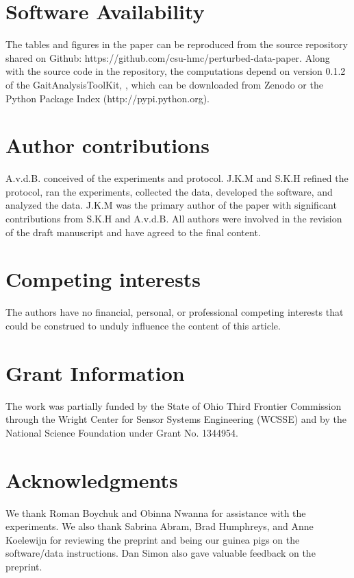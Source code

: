 \documentclass[fleqn,12pt]{wlpeerj}
\begin{document}
\section*{Software Availability}
The tables and figures in the paper can be reproduced from the source
repository shared on Github: https://github.com/csu-hmc/perturbed-data-paper.
Along with the source code in the repository, the computations depend on
version 0.1.2 of the GaitAnalysisToolKit, \cite{Moore2014a}, which can be
downloaded from Zenodo or the Python Package Index (http://pypi.python.org).

\section*{Author contributions}
A.v.d.B. conceived of the experiments and protocol. J.K.M and S.K.H refined the
protocol, ran the experiments, collected the data, developed the software, and
analyzed the data. J.K.M was the primary author of the paper with significant
contributions from S.K.H and A.v.d.B. All authors were involved in the revision
of the draft manuscript and have agreed to the final content.

\section*{Competing interests}
The authors have no financial, personal, or professional competing interests
that could be construed to unduly influence the content of this article.

\section*{Grant Information}
The work was partially funded by the State of Ohio Third Frontier Commission
through the Wright Center for Sensor Systems Engineering (WCSSE) and by the
National Science Foundation under Grant No. 1344954.

\section*{Acknowledgments}
%
We thank Roman Boychuk and Obinna Nwanna for assistance with the experiments.
We also thank Sabrina Abram, Brad Humphreys, and Anne Koelewijn for reviewing
the preprint and being our guinea pigs on the software/data instructions. Dan
Simon also gave valuable feedback on the preprint.


\end{document}

